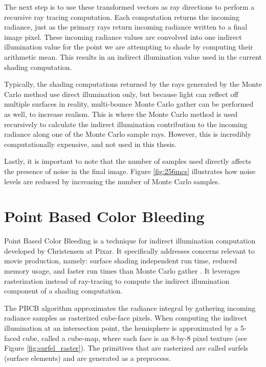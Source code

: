 The next step is to use these transformed vectors as ray directions to perform a recursive ray tracing computation. Each computation returns the incoming radiance, just as the primary rays return incoming radiance written to a final image pixel. These incoming radiance values are convolved into one indirect illumination value for the point we are attempting to shade by computing their arithmetic mean. This results in an indirect illumination value used in the current shading computation.

Typically, the shading computations returned by the rays generated by the Monte Carlo method use direct illumination only, but because light can reflect off multiple surfaces in reality, multi-bounce Monte Carlo gather can be performed as well, to increase realism. This is where the Monte Carlo method is used recursively to calculate the indirect illumination contribution to the incoming radiance along one of the Monte Carlo sample rays. However, this is incredibly computationally expensive, and not used in this thesis.

Lastly, it is important to note that the number of samples used directly affects the presence of noise in the final image. Figure \ref{fig:256mcs} illustrates how noise levels are reduced by increasing the number of Monte Carlo samples.

\section{Point Based Color Bleeding}

Point Based Color Bleeding is a technique for indirect illumination computation developed by Christensen at Pixar. It specifically addresses concerns relevant to movie production, namely: surface shading independent run time, reduced memory usage, and faster run times than Monte Carlo gather \cite{bib:christensen2008}. It leverages rasterization instead of ray-tracing to compute the indirect illumination component of a shading computation.

The PBCB algorithm approximates the radiance integral by gathering incoming radiance samples as rasterized cube-face pixels. When computing the indirect illumination at an intersection point, the hemisphere is approximated by a 5-faced cube, called a cube-map, where each face is an 8-by-8 pixel texture (see Figure \ref{fig:surfel_raster}). The primitives that are rasterized are called surfels (surface elements) and are generated as a preprocess.

